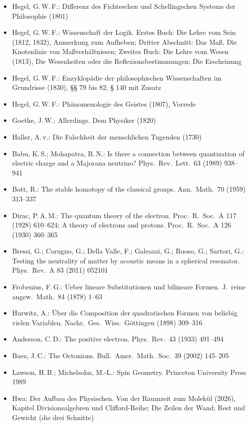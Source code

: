 \documentclass[11pt,a4paper]{article}
\begin{document}
\begin{itemize}[leftmargin=1.2em,itemsep=0pt]
\item Hegel, G.\,W.\,F.: Differenz des Fichteschen und Schellingschen Systems der Philosophie (1801)
\item Hegel, G.\,W.\,F.: Wissenschaft der Logik. Erstes Buch: Die Lehre vom Sein (1812, 1832), Anmerkung zum Aufheben; Dritter Abschnitt: Das Maß, Die Knotenlinie von Maßverhältnissen; Zweites Buch: Die Lehre vom Wesen (1813), Die Wesenheiten oder die Reflexionsbestimmungen; Die Erscheinung
\item Hegel, G.\,W.\,F.: Enzyklopädie der philosophischen Wissenschaften im Grundrisse (1830), §§ 79 bis 82; § 140 mit Zusatz
\item Hegel, G.\,W.\,F.: Phänomenologie des Geistes (1807), Vorrede
\item Goethe, J.\,W.: Allerdings. Dem Physiker (1820)
\item Haller, A.\,v.: Die Falschheit der menschlichen Tugenden (1730)
\item Babu, K.\,S.; Mohapatra, R.\,N.: Is there a connection between quantization of electric charge and a Majorana neutrino? Phys.\ Rev.\ Lett.\ 63 (1989) 938--941
\item Bott, R.: The stable homotopy of the classical groups. Ann.\ Math.\ 70 (1959) 313--337
\item Dirac, P.\,A.\,M.: The quantum theory of the electron. Proc.\ R.\ Soc.\ A 117 (1928) 610--624; A theory of electrons and protons. Proc.\ R.\ Soc.\ A 126 (1930) 360--365
\item Bressi, G.; Carugno, G.; Della Valle, F.; Galeazzi, G.; Ruoso, G.; Sartori, G.: Testing the neutrality of matter by acoustic means in a spherical resonator. Phys.\ Rev.\ A 83 (2011) 052101
\item Frobenius, F.\,G.: Ueber lineare Substitutionen und bilineare Formen. J.\ reine angew.\ Math.\ 84 (1878) 1--63
\item Hurwitz, A.: Über die Composition der quadratischen Formen von beliebig vielen Variablen. Nachr.\ Ges.\ Wiss.\ Göttingen (1898) 309--316
\item Anderson, C.\,D.: The positive electron. Phys.\ Rev.\ 43 (1933) 491--494
\item Baez, J.\,C.: The Octonions. Bull.\ Amer.\ Math.\ Soc.\ 39 (2002) 145--205
\item Lawson, H.\,B.; Michelsohn, M.-L.: Spin Geometry. Princeton University Press 1989
\item Hwa: Der Aufbau des Physischen. Von der Raumzeit zum Molekül (2026), Kapitel Divisionsalgebren und Clifford-Reihe; Die Zeilen der Wand; Rest und Gewicht (die drei Schnitte)

\end{itemize}
\end{document}
